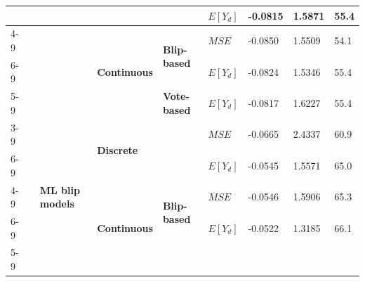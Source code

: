 \documentclass[a4paper,12pt]{article}
\begin{document}
\begin{table}[]
{\begin{tabular}{|l|l|l|l|l|l|l|l|l|}
                                &                                      &                                                              & \multicolumn{2}{l|}{}                                                       & \textbf{$E[Y_d]$} & -0.0815              & 1.5871                        & 55.4              \\ \cline{4-9} 
                                &                                      &                                                              & \multirow{3}{*}{\textbf{Continuous}} & \multirow{2}{*}{\textbf{Blip-based}} & \textbf{$MSE$}  & -0.0850              & 1.5509                        & 54.1              \\ \cline{6-9} 
                                &                                      &                                                              &                                      &                                      & \textbf{$E[Y_d]$} & -0.0824              & 1.5346                        & 55.4              \\ \cline{5-9} 
                                &                                      &                                                              &                                      & \textbf{Vote-based}                  & \textbf{$E[Y_d]$} & -0.0817              & 1.6227                        & 55.4              \\ \cline{3-9} 
                                &                                      & \multirow{5}{*}{\textbf{ML blip models}}                     & \multicolumn{2}{l|}{\multirow{2}{*}{\textbf{Discrete}}}                     & \textbf{$MSE$}  & -0.0665              & 2.4337                        & 60.9              \\ \cline{6-9} 
                                &                                      &                                                              & \multicolumn{2}{l|}{}                                                       & \textbf{$E[Y_d]$} & -0.0545              & 1.5571                        & 65.0              \\ \cline{4-9} 
                                &                                      &                                                              & \multirow{3}{*}{\textbf{Continuous}} & \multirow{2}{*}{\textbf{Blip-based}} & \textbf{$MSE$}  & -0.0546              & 1.5906                        & 65.3              \\ \cline{6-9} 
                                &                                      &                                                              &                                      &                                      & \textbf{$E[Y_d]$} & -0.0522              & 1.3185                        & 66.1              \\ \cline{5-9} 

\end{tabular}}
\end{table}
\end{document}
